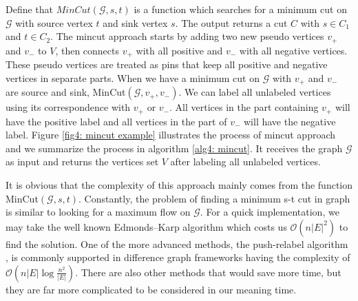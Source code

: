 Define that $MinCut(\mathcal{G}, s, t)$ is a function which searches for a minimum cut on $\mathcal{G}$ with source vertex $t$ and sink vertex $s$. The output returns a cut $C$ with $s \in C_1$ and $t \in C_2$. The mincut approach starts by adding two new pseudo vertices $v_+$ and $v_-$ to $V$, then connects $v_+$ with all positive and $v_-$ with all negative vertices. These pseudo vertices are treated as pins that keep all positive and negative vertices in separate parts. When we have a minimum cut on $\mathcal{G}$ with $v_+$ and $v_-$ are source and sink, MinCut$(\mathcal{G}, v_+, v_-)$. We can label all unlabeled vertices using its correspondence with $v_+$ or $v_-$. All vertices in the part containing $v_+$ will have the positive label and all vertices in the part of $v_-$ will have the negative label. Figure \ref{fig4: mincut example} illustrates the process of mincut approach and we summarize the process in algorithm \ref{alg4: mincut}. It receives the graph $\mathcal{G}$ as input and returns the vertices set $V$ after labeling all unlabeled vertices.

It is obvious that the complexity of this approach mainly comes from the function MinCut$(\mathcal{G}, s, t)$. Constantly, the problem of finding a minimum s-t cut in graph is similar to looking for a maximum flow on $\mathcal{G}$. For a quick implementation, we may take the well known Edmonds–Karp algorithm \parencite{Edmonds:1972:TIA:321694.321699} which costs us $\mathcal{O}(n|E|^2)$ to find the solution. One of the more advanced methods, the push-relabel algorithm \parencite{KING1994447}, is commonly supported in difference graph frameworks having the complexity of $\mathcal{O}(n|E|\log{\frac{n^2}{|E|}})$. There are also other methods that would save more time, but they are far more complicated to be considered in our meaning time.

